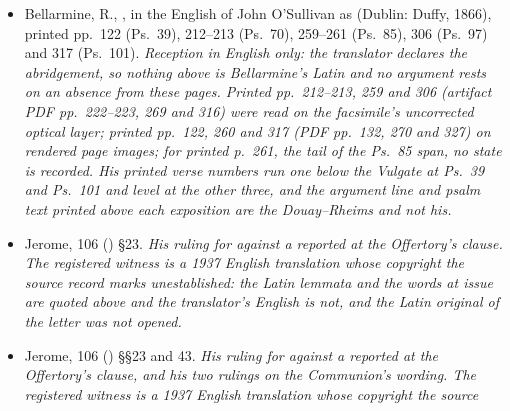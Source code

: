 \begin{itemize}[leftmargin=1.2em, itemsep=0.15em]
 80: cols.\ 1159--1160 (Ps.~39), 1423--1426 (Ps.~70),
1553--1556 (Ps.~85), 1657--1658 (Ps.~97) and 1679--1682 (Ps.~101).
\textit{Migne's reprint of Schulze's Halle recension with a facing Latin version,
not a critical Greek text; every quotation above is Migne's Latin, his Greek
named where the two part and quoted nowhere, and the two differ in tense at
Ps.~101:17. Cols.\ 1423--1424 and 1553--1554 --- the openings of his Ps.~70 and
his Ps.~85 --- were read on the facsimile's uncorrected optical layer; the other
six ranges, cols.\ 1159--1160, 1425--1426, 1555--1556, 1657--1658, 1679--1680
and 1681--1682, on rendered page images. The stable locus in this facsimile is
the column and not the artifact's page, pp.~878--879 reprinting the opening of
pp.~876--877. R.~C. Hill's English is in copyright and was not used.}
\item Bellarmine, R., , in the English of John
O'Sullivan as  (Dublin: Duffy, 1866),
printed pp.~122 (Ps.~39), 212--213 (Ps.~70), 259--261 (Ps.~85), 306 (Ps.~97) and
317 (Ps.~101). \textit{Reception in English only: the translator declares the
abridgement, so nothing above is Bellarmine's Latin and no argument rests on an
absence from these pages. Printed pp.~212--213, 259 and 306 (artifact PDF
pp.~222--223, 269 and 316) were read on the facsimile's uncorrected optical
layer; printed pp.~122, 260 and 317 (PDF pp.~132, 270 and 327) on rendered page
images; for printed p.~261, the tail of the Ps.~85 span, no state is
recorded. His printed verse numbers run one below the Vulgate at
Ps.~39 and Ps.~101 and level at the other three, and the argument line and psalm
text printed above each exposition are the Douay--Rheims and not his.}
\ifdefined\TriptychSynthesisEdition
\item Jerome,  106 () \S23.
\textit{His ruling for  against a reported  at
the Offertory's clause. The
registered witness is a 1937 English translation whose copyright the source
record marks unestablished: the Latin lemmata and the words at issue are quoted
above and the translator's English is not, and the Latin original of the letter
was not opened.}
\else
\item Jerome,  106 () \S\S23 and
43. \textit{His ruling for  against a reported  at
the Offertory's clause, and his two rulings on the Communion's wording. The
registered witness is a 1937 English translation whose copyright the source
}
\end{itemize}
